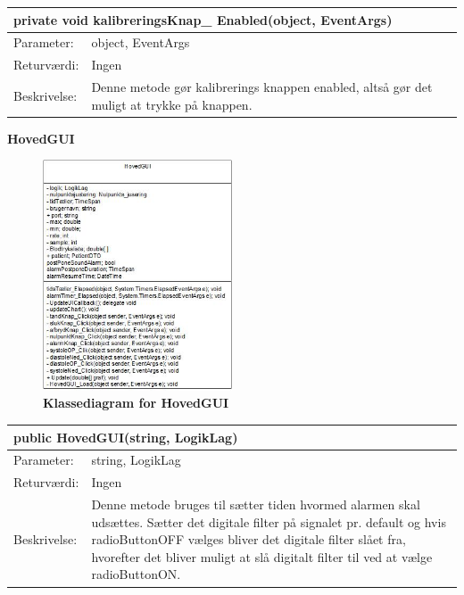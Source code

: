 \begin{table}[H]
\label{tab:tabel2}
\begin{tabular}{| l | p{13cm} |}
   \hline
   \multicolumn{2}{|l|}{private void kalibreringsKnap\_ Enabled(object, EventArgs)} \\ \hline
   Parameter: & object, EventArgs\\ \hline
   Returværdi: & Ingen \\ \hline
   Beskrivelse: & Denne metode gør kalibrerings knappen enabled, altså gør det muligt at trykke på knappen.\\ \hline
\end{tabular}
\end{table}

\textbf{HovedGUI}
\begin{figure}[H]
\includegraphics[width =0.5\textwidth , center]{billeder/klassediagramHoved}
\caption{\textbf{Klassediagram for HovedGUI}}
\end{figure}
\begin{table}[H]
\label{tab:tabel2}
\begin{tabular}{| l | p{13cm} |}
   \hline
   \multicolumn{2}{|l|}{public HovedGUI(string, LogikLag)} \\ \hline
   Parameter: & string, LogikLag\\ \hline
   Returværdi: & Ingen \\ \hline
   Beskrivelse: & Denne metode bruges til sætter tiden hvormed alarmen skal udsættes. Sætter det digitale filter på signalet pr. default og hvis radioButtonOFF vælges bliver det digitale filter slået fra, hvorefter det bliver muligt at slå digitalt filter til ved at vælge radioButtonON.\\ \hline
\end{tabular}
\end{table}
